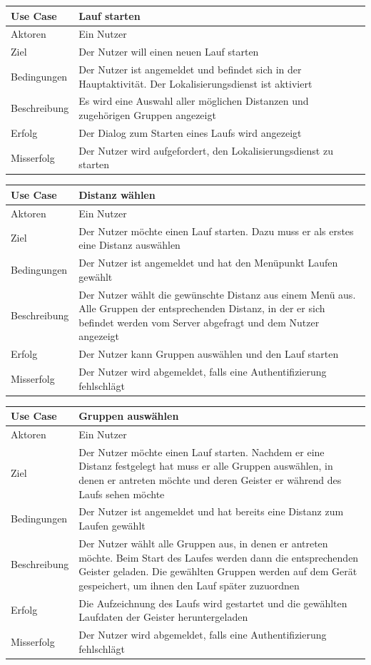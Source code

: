\begin{tabular}{|p{}|p{}|}
\hline
\textbf{Use Case} & \textbf{Lauf starten} \\ \hline
Aktoren &  Ein Nutzer \\ \hline
Ziel &  Der Nutzer will einen neuen Lauf starten \\ \hline
Bedingungen &  Der Nutzer ist angemeldet und befindet sich in der Hauptaktivität. Der Lokalisierungsdienst ist aktiviert \\ \hline
Beschreibung &  Es wird eine Auswahl aller möglichen Distanzen und zugehörigen Gruppen angezeigt\\ \hline
Erfolg & Der Dialog zum Starten eines Laufs wird angezeigt \\ \hline
Misserfolg & Der Nutzer wird aufgefordert, den Lokalisierungsdienst zu starten \\ \hline
\hline \end{tabular}
\begin{tabular}{|p{}|p{}|}
\hline
\textbf{Use Case} & \textbf{Distanz wählen} \\ \hline
Aktoren &  Ein Nutzer \\ \hline
Ziel &  Der Nutzer möchte einen Lauf starten. Dazu muss er als erstes eine Distanz auswählen \\ \hline
Bedingungen &  Der Nutzer ist angemeldet und hat den Menüpunkt Laufen gewählt \\ \hline
Beschreibung & Der Nutzer wählt die gewünschte Distanz aus einem Menü aus. Alle Gruppen der entsprechenden Distanz, in der er sich befindet werden vom Server abgefragt und dem Nutzer angezeigt \\ \hline
Erfolg & Der Nutzer kann Gruppen auswählen und den Lauf starten\\ \hline
Misserfolg & Der Nutzer wird abgemeldet, falls eine Authentifizierung fehlschlägt \\ \hline
\hline \end{tabular}
\begin{tabular}{|p{}|p{}|}
\hline
\textbf{Use Case} & \textbf{Gruppen auswählen} \\ \hline
Aktoren &  Ein Nutzer \\ \hline
Ziel &  Der Nutzer möchte einen Lauf starten. Nachdem er eine Distanz festgelegt hat muss er alle Gruppen auswählen, in denen er antreten möchte und deren Geister er während des Laufs sehen möchte \\ \hline
Bedingungen &  Der Nutzer ist angemeldet und hat bereits eine Distanz zum Laufen gewählt \\ \hline
Beschreibung & Der Nutzer wählt alle Gruppen aus, in denen er antreten möchte. Beim Start des Laufes werden dann die entsprechenden Geister geladen. Die gewählten Gruppen werden auf dem Gerät gespeichert, um ihnen den Lauf später zuzuordnen \\ \hline
Erfolg & Die Aufzeichnung des Laufs wird gestartet und die gewählten Laufdaten der Geister heruntergeladen \\ \hline
Misserfolg & Der Nutzer wird abgemeldet, falls eine Authentifizierung fehlschlägt \\ \hline
\hline \end{tabular}
